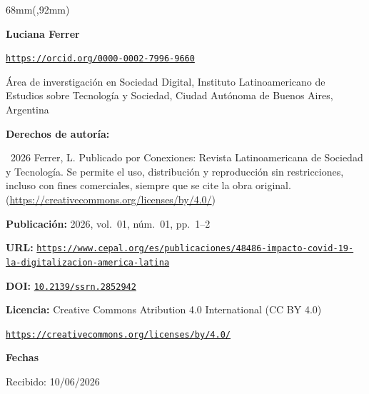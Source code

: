 \begin{textblock*}{68mm}(\gbbloquex,92mm)
{\setlength{\leftskip}{0pt}\setlength{\parindent}{0pt}%
\noindent\begin{minipage}[t]{68mm}
\sffamily\small\setlength{\parskip}{1pt}
{\bfseries\color{azulrevista}Luciana Ferrer}\par
{\scriptsize\texttt{\href{https://orcid.org/0000-0002-7996-9660}{https://orcid.org/0000-0002-7996-9660}}}\par
Área de inverstigación en Sociedad Digital, Instituto Latinoamericano de Estudios sobre Tecnología y Sociedad, Ciudad Autónoma de Buenos Aires, Argentina\par
\vspace{6pt}
{\bfseries\color{azulrevista!70}Derechos de autor\'ia:}\par
\textcopyright\ 2026 Ferrer, L. Publicado por Conexiones: Revista Latinoamericana de Sociedad y Tecnología. Se permite el uso, distribución y reproducción sin restricciones, incluso con fines comerciales, siempre que se cite la obra original. (\href{https://creativecommons.org/licenses/by/4.0/}{https://creativecommons.org/licenses/by/4.0/})\par\vspace{6pt}
{\bfseries\color{azulrevista!70}Publicación:} 2026, vol.~01, n\'um.~01, pp.~1--2\par\vspace{6pt}
{\bfseries\color{azulrevista!70}URL:} {\scriptsize\texttt{\href{https://www.cepal.org/es/publicaciones/48486-impacto-covid-19-la-digitalizacion-america-latina}{https://www.cepal.org/es/publicaciones/48486-impacto-covid-19-la-digitalizacion-america-latina}}}\par\vspace{6pt}
{\bfseries\color{azulrevista!70}DOI:} {\scriptsize\texttt{\href{https://doi.org/10.2139/ssrn.2852942}{10.2139/ssrn.2852942}}}\par\vspace{6pt}
{\bfseries\color{azulrevista!70}Licencia:} Creative Commons Atribution 4.0 International (CC BY 4.0)\par
{\scriptsize\texttt{\href{https://creativecommons.org/licenses/by/4.0/}{https://creativecommons.org/licenses/by/4.0/}}}\par
\vspace{6pt}
{\bfseries\color{azulrevista!70}Fechas}\par\vspace{2pt}
Recibido: 10/06/2026\par

\end{minipage}}
\end{textblock*}
